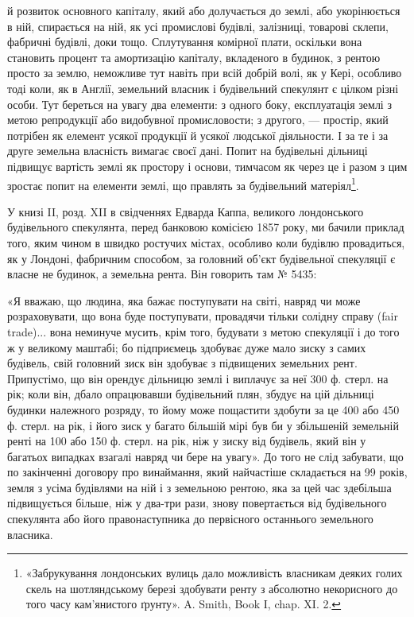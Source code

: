 \parcont{}  %
й розвиток основного капіталу, який або долучається до землі, або укорінюється
в ній, спирається на ній, як усі промислові будівлі, залізниці, товарові склепи,
фабричні будівлі, доки тощо. Сплутування комірної плати, оскільки вона становить
процент та амортизацію капіталу, вкладеного в будинок, з рентою просто за
землю, неможливе тут навіть при всій добрій волі, як у Кері, особливо тоді
коли, як в Англії, земельний власник і будівельний спекулянт є цілком різні
особи. Тут береться на увагу два елементи: з одного боку, експлуатація землі
з метою репродукції або видобувної промисловости; з другого, — простір, який
потрібен як елемент усякої продукції й усякої людської діяльности. І за те і за
друге земельна власність вимагає своєї дані. Попит на будівельні дільниці підвищує
вартість землі як простору і основи, тимчасом як через це і разом
з цим зростає попит на елементи землі, що правлять за будівельний матеріял\footnote{
«Забрукування лондонських вулиць дало можливість власникам деяких голих скель на шотляндському
березі здобувати ренту з абсолютно некорисного до того часу кам’янистого ґрунту». A. Smith, Book I,
chap. XI. 2.
}.

У книзі II, розд. XII в свідченнях Едварда Каппа, великого лондонського
будівельного спекулянта, перед банковою комісією 1857 року, ми бачили приклад
того, яким чином в швидко ростучих містах, особливо коли будівлю провадиться,
як у Лондоні, фабричним способом, за головний об’єкт будівельної
спекуляції є власне не будинок, а земельна рента. Він говорить там № 5435:

«Я вважаю, що людина, яка бажає поступувати на світі, навряд чи може
розраховувати, що вона буде поступувати, провадячи тільки солідну справу (fair
trade)... вона неминуче мусить, крім того, будувати з метою спекуляції і до
того ж у великому маштабі; бо підприємець здобуває дуже мало зиску з самих
будівель, свій головний зиск він здобуває з підвищених земельних рент. Припустімо,
що він орендує дільницю землі і виплачує за неї 300 ф. стерл. на рік;
коли він, дбало опрацювавши будівельний плян, збудує на цій дільниці будинки
належного розряду, то йому може пощастити здобути за це 400 або 450 ф. стерл.
на рік, і його зиск у багато більшій мірі був би у збільшеній земельній ренті
на 100 або 150 ф. стерл. на рік, ніж у зиску від будівель, який він у багатьох
випадках взагалі навряд чи бере на увагу». До того не слід забувати, що
по закінченні договору про винаймання, який найчастіше складається на 99 років,
земля з усіма будівлями на ній і з земельною рентою, яка за цей час
здебільша підвищується більше, ніж у два-три рази, знову повертається від
будівельного спекулянта або його правонаступника до первісного останнього
земельного власника.

